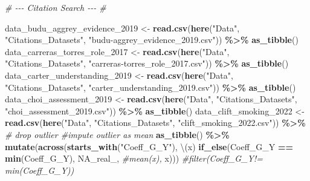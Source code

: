 \documentclass[
]{article}
\newenvironment{Shaded}{\begin{snugshade}}{\end{snugshade}}
\newcommand{\CommentTok}[1]{\textcolor[rgb]{0.56,0.35,0.01}{\textit{#1}}}
\newcommand{\ConstantTok}[1]{\textcolor[rgb]{0.56,0.35,0.01}{#1}}
\newcommand{\FunctionTok}[1]{\textcolor[rgb]{0.13,0.29,0.53}{\textbf{#1}}}
\newcommand{\NormalTok}[1]{#1}
\newcommand{\OtherTok}[1]{\textcolor[rgb]{0.56,0.35,0.01}{#1}}
\newcommand{\SpecialCharTok}[1]{\textcolor[rgb]{0.81,0.36,0.00}{\textbf{#1}}}
\newcommand{\StringTok}[1]{\textcolor[rgb]{0.31,0.60,0.02}{#1}}
\begin{document}
\begin{Shaded}
\begin{Highlighting}[]
\CommentTok{\# {-}{-}{-} Citation Search {-}{-}{-} \# }

\NormalTok{data\_budu\_aggrey\_evidence\_2019 }\OtherTok{\textless{}{-}} \FunctionTok{read.csv}\NormalTok{(}\FunctionTok{here}\NormalTok{(}\StringTok{"Data"}\NormalTok{, }\StringTok{"Citations\_Datasets"}\NormalTok{, }\StringTok{"budu{-}aggrey\_evidence\_2019.csv"}\NormalTok{)) }\SpecialCharTok{\%\textgreater{}\%} \FunctionTok{as\_tibble}\NormalTok{()}
\NormalTok{data\_carreras\_torres\_role\_2017 }\OtherTok{\textless{}{-}} \FunctionTok{read.csv}\NormalTok{(}\FunctionTok{here}\NormalTok{(}\StringTok{"Data"}\NormalTok{, }\StringTok{"Citations\_Datasets"}\NormalTok{, }\StringTok{"carreras{-}torres\_role\_2017.csv"}\NormalTok{)) }\SpecialCharTok{\%\textgreater{}\%} \FunctionTok{as\_tibble}\NormalTok{()}
\NormalTok{data\_carter\_understanding\_2019 }\OtherTok{\textless{}{-}} \FunctionTok{read.csv}\NormalTok{(}\FunctionTok{here}\NormalTok{(}\StringTok{"Data"}\NormalTok{, }\StringTok{"Citations\_Datasets"}\NormalTok{, }\StringTok{"carter\_understanding\_2019.csv"}\NormalTok{)) }\SpecialCharTok{\%\textgreater{}\%} \FunctionTok{as\_tibble}\NormalTok{()}
\NormalTok{data\_choi\_assessment\_2019 }\OtherTok{\textless{}{-}} \FunctionTok{read.csv}\NormalTok{(}\FunctionTok{here}\NormalTok{(}\StringTok{"Data"}\NormalTok{, }\StringTok{"Citations\_Datasets"}\NormalTok{, }\StringTok{"choi\_assessment\_2019.csv"}\NormalTok{)) }\SpecialCharTok{\%\textgreater{}\%} \FunctionTok{as\_tibble}\NormalTok{()}
\NormalTok{data\_clift\_smoking\_2022 }\OtherTok{\textless{}{-}} \FunctionTok{read.csv}\NormalTok{(}\FunctionTok{here}\NormalTok{(}\StringTok{"Data"}\NormalTok{, }\StringTok{"Citations\_Datasets"}\NormalTok{, }\StringTok{"clift\_smoking\_2022.csv"}\NormalTok{)) }\SpecialCharTok{\%\textgreater{}\%} 
  \CommentTok{\# drop outlier \#impute outlier as mean}
  \FunctionTok{as\_tibble}\NormalTok{() }\SpecialCharTok{\%\textgreater{}\%} 
  \FunctionTok{mutate}\NormalTok{(}\FunctionTok{across}\NormalTok{(}\FunctionTok{starts\_with}\NormalTok{(}\StringTok{"Coeff\_G\_Y"}\NormalTok{), \textbackslash{}(x) }\FunctionTok{if\_else}\NormalTok{(Coeff\_G\_Y }\SpecialCharTok{==} \FunctionTok{min}\NormalTok{(Coeff\_G\_Y),}
                                                       \ConstantTok{NA\_real\_}\NormalTok{,}
                                                       \CommentTok{\#mean(x),}
\NormalTok{                                                       x)))}
  \CommentTok{\#filter(Coeff\_G\_Y!= min(Coeff\_G\_Y))}

\end{Highlighting}
\end{Shaded}
\end{document}
